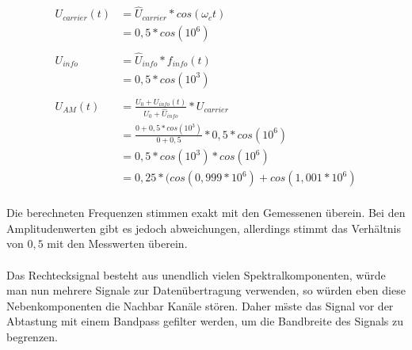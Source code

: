 \begin{center}
  \begin{align*}
    U_{carrier}(t) &= \hat{U}_{carrier} * cos(\omega_c t)\\
		   &= 0,5 * cos(10^6)\\ \\
    U_{info} &= \hat{U}_{info} * f_{info}(t)\\
	     &= 0,5  * cos(10^3)\\ \\
    U_{AM}(t) &= \frac{U_0 + U_{info}(t)}{U_0 + \hat{U}_{info}} * U_{carrier}\\
	      &= \frac{0 + 0,5  * cos(10^3)}{0 + 0,5} * 0,5 * cos(10^6)\\
	      &= 0,5 * cos(10^3) * cos(10^6)\\
	      &= 0,25 * (cos(0,999*10^6) + cos(1,001*10^6)\\
  \end{align*}
\end{center}
\noindent
Die berechneten Frequenzen stimmen exakt mit den Gemessenen überein. Bei den Amplitudenwerten gibt es jedoch abweichungen, allerdings
stimmt das Verhältnis von $0,5$ mit den Messwerten überein.\\
\\
Das Rechtecksignal besteht aus unendlich vielen Spektralkomponenten, w\"urde man nun mehrere Signale zur Daten\"ubertragung verwenden, so w\"urden eben diese Nebenkomponenten die Nachbar Kan\"ale st\"oren. Daher m\"sste das Signal vor der Abtastung mit einem Bandpass gefilter werden, um die Bandbreite des Signals zu begrenzen.\\
